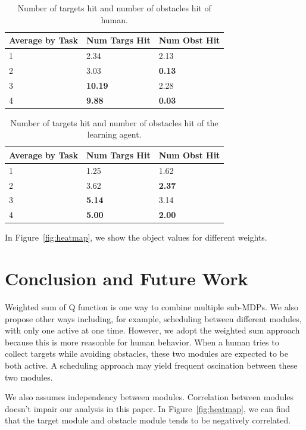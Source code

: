 \documentclass[11pt]{article} %
\begin{document}
\begin{table}[h]
\centering
\begin{tabular}{| l| l| l |}
\hline
Average by Task & Num Targs Hit & Num Obst Hit\\
\hline
1 & 2.34 &  2.13\\
\hline
2 & 3.03 &  \bf{0.13}\\
\hline
3 & \bf{10.19} & 2.28\\
\hline
4 & \bf{9.88} &  \bf{0.03}\\
\hline
\end{tabular}
\caption{Number of targets hit and number of obstacles hit of human.}
\end{table}

\begin{table}[h]
\centering
\begin{tabular}{| l| l| l |}
\hline
Average by Task & Num Targs Hit & Num Obst Hit\\
\hline
1 & 1.25 & 1.62\\
\hline
2 & 3.62 & \bf{2.37}\\
\hline
3 & \bf{5.14} & 3.14\\
\hline
4 & \bf{5.00} & \bf{2.00}\\
\hline
\end{tabular}
\caption{Number of targets hit and number of obstacles hit of the learning agent.}
\end{table}

In Figure~\ref{fig:heatmap}, we show the object values for different weights.

\section{Conclusion and Future Work}

Weighted sum of Q function is one way to combine multiple sub-MDPs. We also
propose other ways including, for example, scheduling between different modules,
with only one active at one time. However, we adopt the weighted sum approach
because this is more reasonble for human behavior. When a human tries to collect
targets while avoiding obstacles, these two modules are expected to be both
active. A scheduling approach may yield frequent oscination between these two
modules.

We also assumes independency between modules. Correlation between modules
doesn't impair our analysis in this paper. In Figure~\ref{fig:heatmap}, we can
find that the target module and obstacle module tends to be negatively
correlated.



\end{document}
